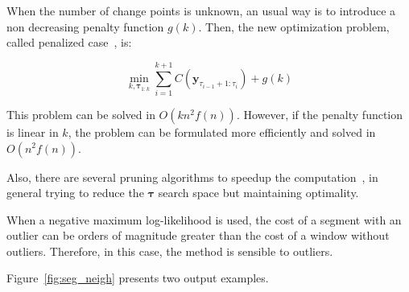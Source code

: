 When the number of change points is unknown, an usual way is to introduce a non
decreasing penalty function $g(k)$. Then, the new optimization problem, called
penalized case~\cite{on_optimal_multiple_changepoint_algorithms_for_large_data},
is:

\begin{equation}
    \min_{k, \boldsymbol \tau_{1 : k}} \sum \limits_{i = 1}^{k + 1} C(\mathbf{y}_{\tau_{i - 1} + 1 : \tau_{i}}) + g(k)
\end{equation}

This problem can be solved in $O(k n^{2} f(n))$. However, if the penalty
function is linear in $k$, the problem can be formulated more efficiently and
solved in $O(n^{2} f(n))$.

Also, there are several pruning algorithms to speedup the
computation~\cite{optimal_detection_of_changepoints_with_a_linear_computational_cost, on_optimal_multiple_changepoint_algorithms_for_large_data, computationally_efficient_changepoint_detection_for_a_range_of_penalties},
in general trying to reduce the $\boldsymbol \tau$ search space but maintaining
optimality.

When a negative maximum log-likelihood is
used, the cost of a segment with an outlier can be orders of magnitude greater
than the cost of a window without outliers. Therefore,
in this case, the method is sensible to outliers.

Figure~\ref{fig:seg_neigh} presents two output examples.

